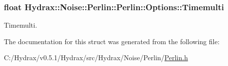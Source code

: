 \hypertarget{struct_hydrax_1_1_noise_1_1_perlin_1_1_options_7619c42d9f43aa51d26dd954d56b17c3}{
\subsubsection[{Timemulti}]{\setlength{\rightskip}{0pt plus 5cm}float Hydrax::Noise::Perlin::Perlin::Options::Timemulti}}
\label{struct_hydrax_1_1_noise_1_1_perlin_1_1_options_7619c42d9f43aa51d26dd954d56b17c3}


Timemulti. 



The documentation for this struct was generated from the following file:\begin{CompactItemize}
\item 
C:/Hydrax/v0.5.1/Hydrax/src/Hydrax/Noise/Perlin/\hyperlink{_perlin_8h}{Perlin.h}\end{CompactItemize}
